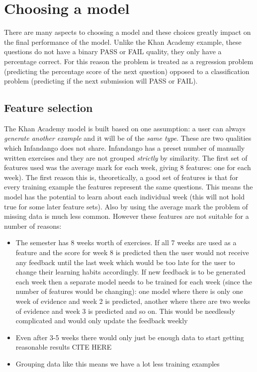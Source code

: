 \chapter{Choosing a model}
\label{machinelearning}
There are many aspects to choosing a model and these choices greatly impact on the final performance of the model. Unlike the Khan Academy example, these questions do not have a binary PASS or FAIL quality, they only have a percentage correct. For this reason the problem is treated as a regression problem (predicting the percentage score of the next question) opposed to a classification problem (predicting if the next submission will PASS or FAIL).

\section{Feature selection}
The Khan Academy model is built based on one assumption: a user can always \emph{generate another example} and it will be of the \emph{same type}. These are two qualities which Infandango does not share. Infandango has a preset number of manually written exercises and they are not grouped \emph{strictly} by similarity. The first set of features used was the average mark for each week, giving 8 features: one for each week). The first reason this is, theoretically, a good set of features is that for every training example the features represent the same questions. This means the model has the potential to learn about each individual week (this will not hold true for some later feature sets). Also by using the average mark the problem of missing data is much less common. However these features are not suitable for a number of reasons:

\begin{itemize}
\item The semester has 8 weeks worth of exercises. If all 7 weeks are used as a feature and the score for week 8 is predicted then the user would not receive any feedback until the last week which would be too late for the user to change their learning habits accordingly. If new feedback is to be generated each week then a separate model needs to be trained for each week (since the number of features would be changing): one model where there is only one week of evidence and week 2 is predicted, another where there are two weeks of evidence and week 3 is predicted and so on. This would be needlessly complicated and would only update the feedback weekly
\item Even after 3-5 weeks there would only just be enough data to start getting reasonable results CITE HERE %
\item Grouping data like this means we have a lot less training examples
\end{itemize}

